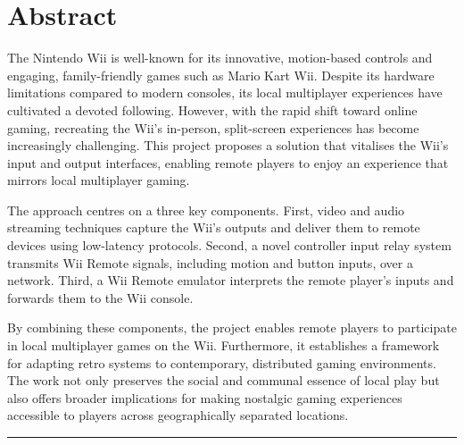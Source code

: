 \chapter*{Abstract}

The Nintendo Wii is well-known for its innovative, motion-based controls and engaging, family-friendly games such as Mario Kart Wii. Despite its hardware limitations compared to modern consoles, its local multiplayer experiences have cultivated a devoted following. However, with the rapid shift toward online gaming, recreating the Wii’s in-person, split-screen experiences has become increasingly challenging. This project proposes a solution that vitalises the Wii’s input and output interfaces, enabling remote players to enjoy an experience that mirrors local multiplayer gaming.

The approach centres on a three key components. First, video and audio streaming techniques capture the Wii’s outputs and deliver them to remote devices using low-latency protocols. Second, a novel controller input relay system transmits Wii Remote signals, including motion and button inputs, over a network. Third, a Wii Remote emulator interprets the remote player’s inputs and forwards them to the Wii console.

By combining these components, the project enables remote players to participate in local multiplayer games on the Wii. Furthermore, it establishes a framework for adapting retro systems to contemporary, distributed gaming environments. The work not only preserves the social and communal essence of local play but also offers broader implications for making nostalgic gaming experiences accessible to players across geographically separated locations.

\begin{center}
	\noindent\rule{8cm}{0.4pt}
\end{center}
